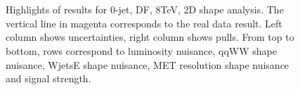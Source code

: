 \begin{figure}[!hbtp]
{}
\\
\\
\caption{Highlights of results for 0-jet, DF, 8TeV, 2D shape analysis. The vertical line in magenta corresponds to the real data result.
Left column shows uncertainties, right column shows pulls. From top to bottom, rows correspond to luminosity nuisance, qqWW shape nuisance, 
WjetsE shape nuisance, MET resolution shape nuisance and signal strength.}
\label{fig:nuis2D0jdf8Tev}
\end{figure}


